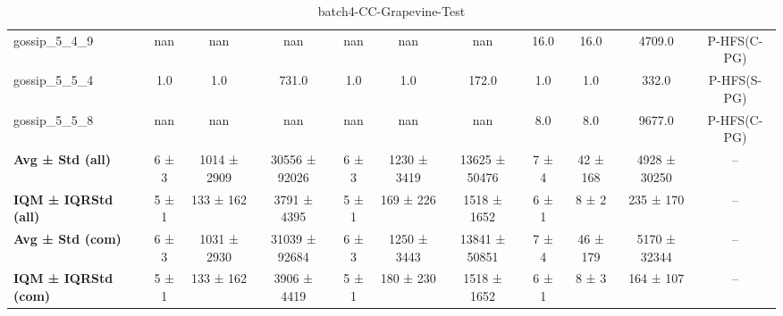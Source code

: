 \begin{table}[!ht]
\begin{tabular}{l|ccc|ccc|cccc}
gossip\_5\_4\_9 & nan & nan & nan & nan & nan & nan & 16.0 & 16.0 & 4709.0 & P-HFS(C-PG) \\
gossip\_5\_5\_4 & 1.0 & 1.0 & 731.0 & 1.0 & 1.0 & 172.0 & 1.0 & 1.0 & 332.0 & P-HFS(S-PG) \\
gossip\_5\_5\_8 & nan & nan & nan & nan & nan & nan & 8.0 & 8.0 & 9677.0 & P-HFS(C-PG) \\
\hline
\textbf{Avg ± Std (all)} & 6 ± 3 & 1014 ± 2909 & 30556 ± 92026 & 6 ± 3 & 1230 ± 3419 & 13625 ± 50476 & 7 ± 4 & 42 ± 168 & 4928 ± 30250 & -- \\
\textbf{IQM ± IQRStd (all)} & 5 ± 1 & 133 ± 162 & 3791 ± 4395 & 5 ± 1 & 169 ± 226 & 1518 ± 1652 & 6 ± 1 & 8 ± 2 & 235 ± 170 & -- \\
\textbf{Avg ± Std (com)} & 6 ± 3 & 1031 ± 2930 & 31039 ± 92684 & 6 ± 3 & 1250 ± 3443 & 13841 ± 50851 & 7 ± 4 & 46 ± 179 & 5170 ± 32344 & -- \\
\textbf{IQM ± IQRStd (com)} & 5 ± 1 & 133 ± 162 & 3906 ± 4419 & 5 ± 1 & 180 ± 230 & 1518 ± 1652 & 6 ± 1 & 8 ± 3 & 164 ± 107 & -- \\
\end{tabular}
\caption{batch4-CC-Grapevine-Test}
\label{tab:batch4_CC-Grapevine_comparison_test}
\end{table}

